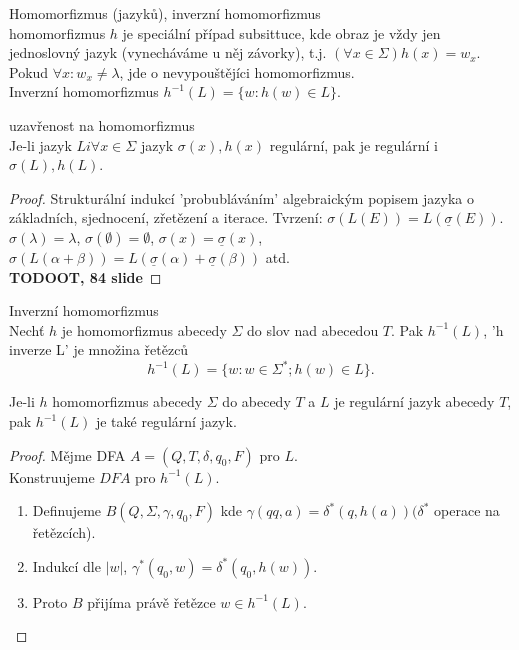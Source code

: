 \documentclass[../main.tex]{subfiles}
\begin{document}
\begin{definition}
    Homomorfizmus (jazyků), inverzní homomorfizmus\\

    homomorfizmus $h$ je speciální případ subsittuce, kde obraz je vždy jen jednoslovný jazyk
    (vynecháváme u něj závorky), t.j. $(\forall x \in \Sigma) h(x) = w_x.$\\
    Pokud $\forall x : w_x \neq \lambda$, jde o nevypouštějíci homomorfizmus.\\
    Inverzní homomorfizmus $h^{-1}(L) = \{w : h(w) \in L\}$.
\end{definition}

\begin{theorem}
    uzavřenost na homomorfizmus\\

    Je-li jazyk $L i \forall x \in \Sigma$ jazyk $\sigma(x),h(x)$ regulární, pak je regulární i $\sigma(L), h(L)$.
    \begin{proof}
        Strukturální indukcí 'probubláváním' algebraickým popisem jazyka o základních, sjednocení, zřetězení a iterace. Tvrzení:
        $\sigma(L(E)) = L(\underline{\sigma}(E)).$ $\sigma({\lambda}) = \lambda$, $\sigma(\emptyset) = \emptyset$,
        $\sigma({x}) = \underline{\sigma}(x)$, $\sigma(L(\alpha + \beta)) = L(\underline{\sigma}(\alpha) + \underline{\sigma}(\beta))$ atd.\\

        \textbf{TODOOT, 84 slide}
    \end{proof}
\end{theorem}

\begin{definition}
    Inverzní homomorfizmus\\

    Nechť $h$ je homomorfizmus abecedy $\Sigma$ do slov nad abecedou $T$. Pak $h^{-1}(L)$, 'h inverze L' je množina řetězců
    \[h^{-1}(L) = \{w : w \in \Sigma^*; h(w) \in L\}.\]
\end{definition}
\begin{theorem}
    Je-li $h$ homomorfizmus abecedy $\Sigma$ do abecedy $T$ a $L$ je regulární jazyk abecedy $T$, pak $h^{-1}(L)$ je také regulární jazyk.
    \begin{proof}
        Mějme DFA $A = (Q,T,\delta,q_0,F)$ pro $L$.\\
        Konstruujeme $DFA$ pro $h^{-1}(L)$.
        \begin{enumerate}
            \item Definujeme $B(Q,\Sigma, \gamma, q_0, F)$ kde $\gamma(qq,a) = \delta^*(q,h(a)) (\delta^*$ operace na řetězcích).
            \item Indukcí dle $|w|$, $\gamma^*(q_0,w) = \delta^*(q_0,h(w))$.
            \item Proto $B$ přijíma právě řetězce $w\in h^{-1}(L)$.
        \end{enumerate}
    \end{proof}
\end{theorem}
\end{document}
